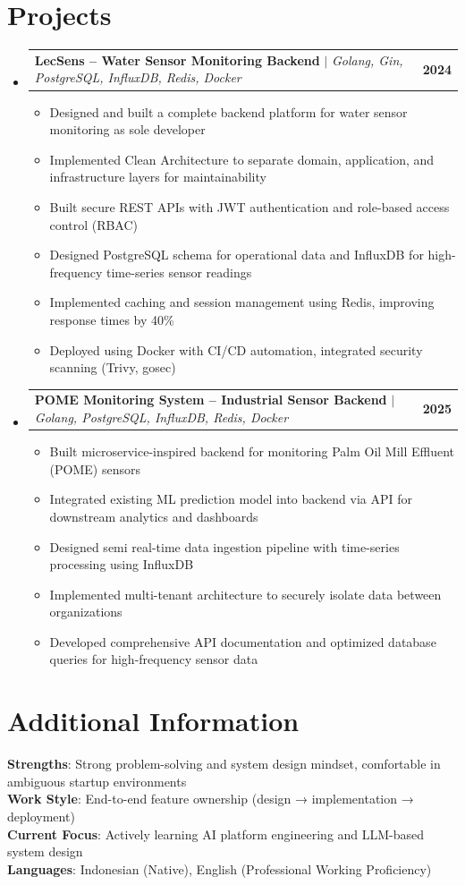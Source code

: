 \documentclass[letterpaper,11pt]{article}
\makeatletter
\newcommand{\resumeItem}[1]{
  \item\small{
    {#1 \vspace{-2pt}}
  }
}
\newcommand{\resumeProjectHeading}[2]{
    \item
    \begin{tabular*}{1.001\textwidth}{l@{\extracolsep{\fill}}r}
      \small#1 & \textbf{\small #2}\\
    \end{tabular*}\vspace{-7pt}
}
\newcommand{\resumeSubHeadingListStart}{\begin{itemize}[leftmargin=0.0in, label={}]}
\newcommand{\resumeSubHeadingListEnd}{\end{itemize}}
\newcommand{\resumeItemListStart}{\begin{itemize}}
\newcommand{\resumeItemListEnd}{\end{itemize}\vspace{-5pt}}
\makeatother
\begin{document}
\section{Projects}
    \vspace{-5pt}
    \resumeSubHeadingListStart
      \resumeProjectHeading
          {\textbf{LecSens -- Water Sensor Monitoring Backend} $|$ \emph{Golang, Gin, PostgreSQL, InfluxDB, Redis, Docker}}{2024}
          \resumeItemListStart
            \resumeItem{Designed and built a complete backend platform for water sensor monitoring as sole developer}
            \resumeItem{Implemented Clean Architecture to separate domain, application, and infrastructure layers for maintainability}
            \resumeItem{Built secure REST APIs with JWT authentication and role-based access control (RBAC)}
            \resumeItem{Designed PostgreSQL schema for operational data and InfluxDB for high-frequency time-series sensor readings}
            \resumeItem{Implemented caching and session management using Redis, improving response times by 40\%}
            \resumeItem{Deployed using Docker with CI/CD automation, integrated security scanning (Trivy, gosec)}
          \resumeItemListEnd
          \vspace{-13pt}
      \resumeProjectHeading
          {\textbf{POME Monitoring System -- Industrial Sensor Backend} $|$ \emph{Golang, PostgreSQL, InfluxDB, Redis, Docker}}{2025}
          \resumeItemListStart
            \resumeItem{Built microservice-inspired backend for monitoring Palm Oil Mill Effluent (POME) sensors}
            \resumeItem{Integrated existing ML prediction model into backend via API for downstream analytics and dashboards}
            \resumeItem{Designed semi real-time data ingestion pipeline with time-series processing using InfluxDB}
            \resumeItem{Implemented multi-tenant architecture to securely isolate data between organizations}
            \resumeItem{Developed comprehensive API documentation and optimized database queries for high-frequency sensor data}
          \resumeItemListEnd
    \resumeSubHeadingListEnd
\vspace{-12pt}


\section{Additional Information}
 \begin{itemize}[leftmargin=0.15in, label={}]
    \small{\item{
     \textbf{Strengths}{: Strong problem-solving and system design mindset, comfortable in ambiguous startup environments} \\
     \textbf{Work Style}{: End-to-end feature ownership (design → implementation → deployment)} \\
     \textbf{Current Focus}{: Actively learning AI platform engineering and LLM-based system design} \\
     \textbf{Languages}{: Indonesian (Native), English (Professional Working Proficiency)}
    }}
 \end{itemize}
\end{document}
